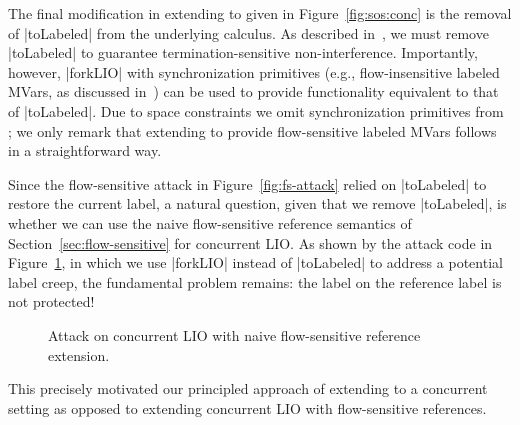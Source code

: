 The final modification in extending \lioafs{} to \lioconc{} given in
Figure~\ref{fig:sos:conc} is the removal of |toLabeled| from the underlying
calculus.
%
As described in~\cite{stefan:addressing-covert}, we must remove |toLabeled| to
guarantee termination-sensitive non-interference.
%
Importantly, however, |forkLIO| with synchronization primitives (e.g.,
flow-insensitive labeled MVars, as discussed
in~\cite{stefan:addressing-covert}) can be used to provide functionality
equivalent to that of |toLabeled|.
%
Due to space constraints we omit synchronization primitives from
\lioconc{};
we only remark that extending \lioconc{} to provide flow-sensitive
labeled MVars follows in a straightforward way.

Since the flow-sensitive attack in Figure~\ref{fig:fs-attack} relied
on |toLabeled| to restore the current label, a natural question, given
that we remove |toLabeled|, is whether we can use the naive
flow-sensitive reference semantics of Section~\ref{sec:flow-sensitive}
for concurrent LIO.
%
As shown by the attack code in Figure~\ref{fig:fs-conc-attack}, in
which we use |forkLIO| instead of |toLabeled| to address a potential
label creep, the fundamental problem remains: the label on the
reference label is not protected!
%
\begin{figure}
\small
{}
\cut{$}
\caption{Attack on concurrent LIO with naive flow-sensitive reference
extension.
\label{fig:fs-conc-attack}}
\end{figure}
%
This precisely motivated our principled approach of extending \lioafs{} to a
concurrent setting as opposed to extending concurrent LIO with flow-sensitive
references.

